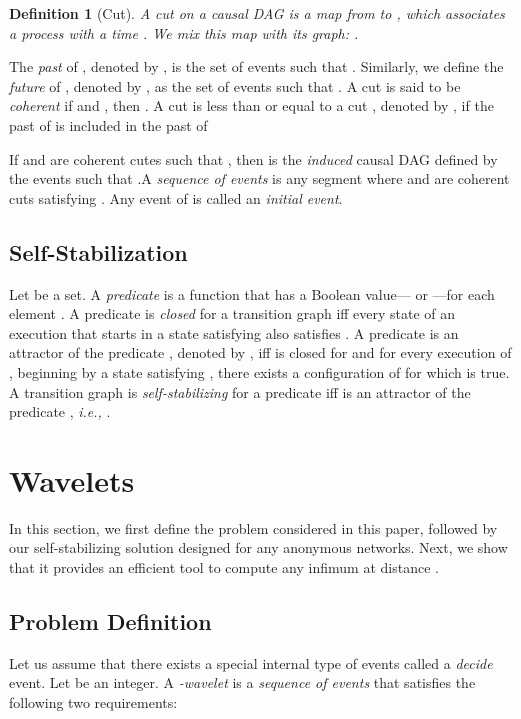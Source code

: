 \documentclass[11pt]{article}
\newtheorem{definition}[theorem]{Definition}
\newcommand{\ie}{\emph{i.e., }}
\begin{document}
\begin{definition}[Cut]
A cut  on a causal DAG is a map from  to , which associates
a process  with a time . We mix this map with its graph: .\end{definition}

The \emph{past} of , denoted by , is the set of events 
 such that . 
Similarly, we define the \emph{future} of , denoted by , as the set of 
events  such that . 
A cut is said to be \emph{coherent} if  and ,
then  .
A cut  is less than or equal to a cut , denoted by ,
if the past of  is included in the past of 

If  and  are coherent cutes such that , then  is the 
\emph{induced} causal DAG defined by the events  such
that .A \emph{sequence of events} is any segment 
where  and  are coherent cuts satisfying .  
Any event of  is called an \emph{initial event}.

\subsection{Self-Stabilization}
Let  be a set. A \emph{predicate}  is a function that has a Boolean 
value--- or ---for each element .
A predicate  is \emph{closed} for a transition graph  iff 
every state of an execution  that starts in a state satisfying  also satisfies .
A predicate  is an attractor of the predicate , denoted by ,
iff  is closed for  and for every execution  of , beginning by a state satisfying , 
there exists a configuration of  for which  is true. 
A transition graph  is \emph{self-stabilizing} for a predicate  iff  is an attractor 
of the predicate , \ie .



\section{Wavelets}
\label{sec:wave}

In this section, we first define the problem considered in this paper, followed 
by our self-stabilizing solution designed for any anonymous networks. Next, we show that 
it provides an efficient tool to compute any infimum at distance . 

\subsection{Problem Definition}
Let us assume that there exists a special internal type of events called a \emph{decide} event. Let   be an integer.
A \emph{-wavelet} is a \emph{sequence of events}  
that satisfies the following two requirements:
\end{document}

